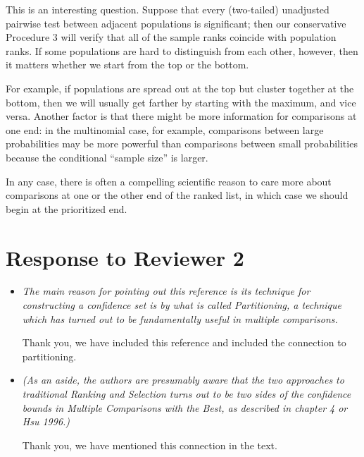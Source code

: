 \documentclass[]{article}
\theoremstyle{remark}
\begin{document}
\begin{itemize}
This is an interesting question. Suppose that every (two-tailed) unadjusted pairwise test between adjacent populations is significant; then our conservative Procedure 3 will verify that all of the sample ranks coincide with population ranks. If some populations are hard to distinguish from each other, however, then it matters whether we start from the top or the bottom.

For example, if populations are spread out at the top but cluster together at the bottom, then we will usually get farther by starting with the maximum, and vice versa. Another factor is that there might be more information for comparisons at one end: in the multinomial case, for example, comparisons between large probabilities may be more powerful than comparisons between small probabilities because the conditional ``sample size'' is larger.

In any case, there is often a compelling scientific reason to care more about comparisons at one or the other end of the ranked list, in which case we should begin at the prioritized end.

\end{itemize}

\section{Response to Reviewer 2}

\begin{itemize}

\item {\em The main reason for pointing out this reference is its technique for constructing a confidence set is by what is called Partitioning, a technique which has turned out to be fundamentally useful in multiple comparisons.}

Thank you, we have included this reference and included the connection to partitioning. 

\item {\em (As an aside, the authors are presumably aware that the two approaches to traditional Ranking and Selection turns out to be two sides of the confidence bounds in Multiple Comparisons with the Best, as described in chapter 4 or Hsu 1996.)}

Thank you, we have mentioned this connection in the text.

\end{itemize}



\end{document}
